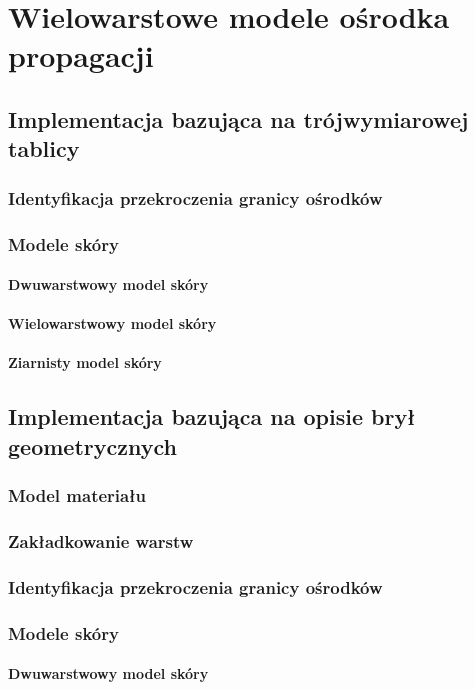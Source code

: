 \section{Wielowarstowe modele ośrodka propagacji}
\subsection{Implementacja bazująca na trójwymiarowej tablicy}
\subsubsection{Identyfikacja przekroczenia granicy ośrodków}
\subsubsection{Modele skóry}
\paragraph{Dwuwarstwowy model skóry}
\paragraph{Wielowarstwowy model skóry}
\paragraph{Ziarnisty model skóry}
\subsection{Implementacja bazująca na opisie brył geometrycznych}
\subsubsection{Model materiału}
\subsubsection{Zakładkowanie warstw}
\subsubsection{Identyfikacja przekroczenia granicy ośrodków}
\subsubsection{Modele skóry}
\paragraph{Dwuwarstwowy model skóry}
